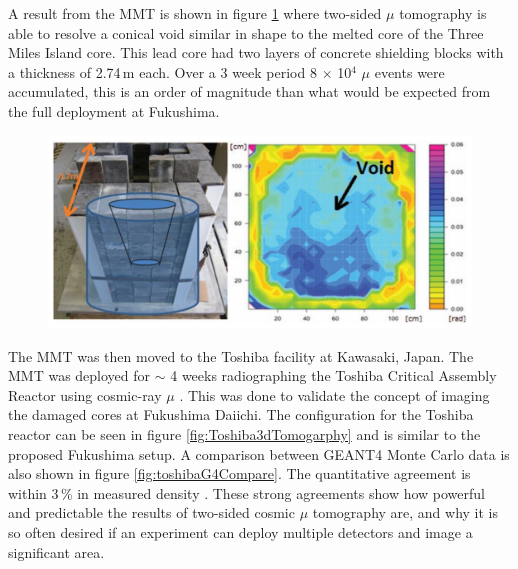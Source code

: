 A result from the MMT is shown in figure \ref{fig:fukushimaFakeCore} where two-sided $\mu$ tomography is able to resolve a conical void similar in shape to the melted core of the Three Miles Island core. This lead core had two layers of concrete shielding blocks with a thickness of 2.74\,m each. Over a 3 week period 8 $\times$ 10$^4$ $\mu$ events were accumulated, this is an order of magnitude than what would be expected from the full deployment at Fukushima. 

\begin{figure}[!h]
 \centering
 \includegraphics[width=0.7\linewidth]{Chapter5/Figs/MuTomographyExamples/FukushimaFakeCore.jpg}
 \label{fig:fukushimaFakeCore}
\end{figure}

The MMT was then moved to the Toshiba facility at Kawasaki, Japan. The MMT was deployed for $\sim$ 4 weeks radiographing the Toshiba Critical Assembly Reactor using cosmic-ray $\mu$ \cite{morris2014analysis}. This was done to validate the concept of imaging the damaged cores at Fukushima Daiichi. The configuration for the Toshiba reactor can be seen in figure \ref{fig:Toshiba3dTomogarphy} and is similar to the proposed Fukushima setup. A comparison between GEANT4 Monte Carlo data is also shown in figure \ref{fig:toshibaG4Compare}. The quantitative agreement is within 3\,\% in measured density \cite{morris2014analysis}. These strong agreements show how powerful and predictable the results of two-sided cosmic $\mu$ tomography are, and why it is so often desired if an experiment can deploy multiple detectors and image a significant area. 

